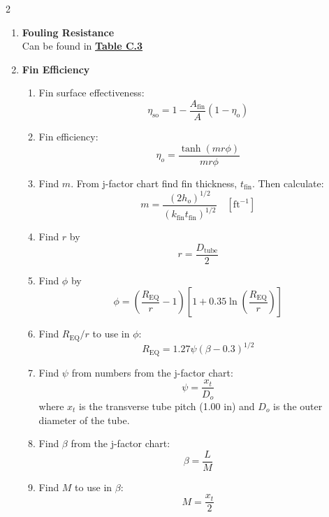 \begin{multicols*}{2}
\begin{enumerate}
\begin{itemize}
              \end{itemize}
        \item \textbf{Fouling Resistance} \\
              Can be found in \underline{\textbf{Table C.3}}
        \item \textbf{Fin Efficiency}
              \begin{enumerate}[label=\roman*.]
                  \item Fin surface effectiveness:
                        \[
                            \eta_{\text{so}} = 1 - \frac{A_\text{fin}}{A} \left(1 - \eta_\text{o}\right)
                        \]
                  \item Fin efficiency:
                        \[
                            \eta_o = \frac{\tanh(mr\phi)}{mr\phi}
                        \]
                  \item Find $m$. From j-factor chart find fin thickness, $t_\text{fin}$. Then calculate:
                        \[
                            m = \frac{(2 h_o)^{1/2}}{(k_\text{fin} t_\text{fin})^{1/2}} \quad [\text{ft}^{-1}]
                        \]
                  \item Find $r$ by
                        \[
                            r = \frac{D_\text{tube}}{2}
                        \]
                  \item Find $\phi$ by
                        \[
                            \phi = \left(\frac{R_{\text{EQ}}}{r} - 1\right)\left[1 + 0.35 \ln\left(\frac{R_{\text{EQ}}}{r}\right)\right]
                        \]
                  \item Find $R_{\text{EQ}} / r$ to use in $\phi$:
                        \[
                            R_{\text{EQ}} = 1.27 \psi (\beta - 0.3)^{1/2}
                        \]
                  \item Find $\psi$ from numbers from the j-factor chart:
                        \[
                            \psi = \frac{x_t}{D_o}
                        \]
                        where $x_t$ is the transverse tube pitch (1.00 in) and $D_o$ is the outer diameter of the tube.
                  \item Find $\beta$ from the j-factor chart:
                        \[
                            \beta = \frac{L}{M}
                        \]
                  \item Find $M$ to use in $\beta$:
                        \[
                            M = \frac{x_t}{2}
                        \]

\end{enumerate}
\end{enumerate}
\end{multicols*}
